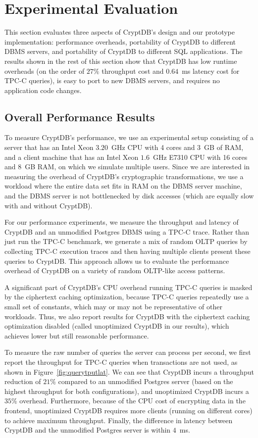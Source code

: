 \section{Experimental Evaluation}
\label{s:eval}

This section evaluates three aspects of CryptDB's design and our
prototype implementation: performance overheads, portability of
CryptDB to different DBMS servers, and portability of CryptDB
to different SQL applications.  The results shown in the
rest of this section show that CryptDB has low runtime overheads
(on the order of $27\%$ throughput cost and $0.64$~ms latency
cost for TPC-C queries), is easy to port to new DBMS servers,
and requires no application code changes.

\subsection{Overall Performance Results}

To measure CryptDB's performance, we use an experimental setup
consisting of a server that has an Intel Xeon $3.20$~GHz CPU
with 4 cores and 3~GB of RAM, and a client machine that has an
Intel Xeon $1.6$~GHz E7310 CPU with 16 cores and $8$~GB RAM, on
which we simulate multiple users.  Since we are interested in
measuring the overhead of CryptDB's cryptographic transformations,
we use a workload where the entire data set fits in RAM on the
DBMS server machine, and the DBMS server is not bottlenecked by
disk accesses (which are equally slow with and without CryptDB).

For our performance experiments, we measure the throughput and latency
of CryptDB and an unmodified Postgres DBMS using a TPC-C trace.
Rather than just run the TPC-C benchmark, we generate a mix of random
OLTP queries by collecting TPC-C execution traces and then having
multiple clients present these queries to CryptDB\@.  This approach
allows us to evaluate the performance overhead of CryptDB on a variety
of random OLTP-like access patterns.

A significant part of CryptDB's CPU overhead running TPC-C queries is
masked by the ciphertext caching optimization, because TPC-C queries
repeatedly use a small set of constants, which may or may not be
representative of other workloads.  Thus, we also report results for
CryptDB with the ciphertext caching optimization disabled (called
unoptimized CryptDB in our results), which achieves lower but still
reasonable performance.

To measure the raw number of queries the server can process per
second, we first report the throughput for TPC-C queries when
transactions are not used, as shown in Figure~\ref{fig:querytputlat}.
We can see that CryptDB incurs a throughput reduction of $21\%$
compared to an unmodified Postgres server (based on the highest
throughput for both configurations), and unoptimized CryptDB
incurs a $35\%$ overhead.  Furthermore, because of the CPU cost
of encrypting data in the frontend, unoptimized CryptDB requires
more clients (running on different cores) to achieve maximum
throughput.  Finally, the difference in latency between CryptDB
and the unmodified Postgres server is within $4$~ms.

